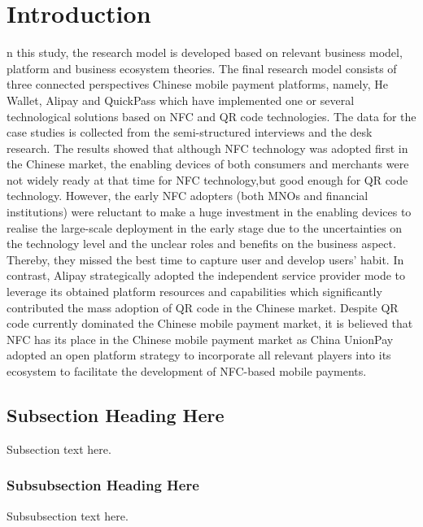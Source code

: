\documentclass[journal]{IEEEtran}
\begin{document}
\section{Introduction}
n this study, the research model is developed based on relevant business model, platform and
business ecosystem theories. The final research model consists of three connected perspectives
 Chinese mobile payment platforms, namely, He Wallet, Alipay and QuickPass which have
implemented one or several technological solutions based on NFC and QR code technologies. The
data for the case studies is collected from the semi-structured interviews and the desk research. The
results showed that although NFC technology was adopted first in the Chinese market, the enabling
devices of both consumers and merchants were not widely ready at that time for NFC technology,but good enough for QR code technology. However, the early NFC adopters (both MNOs and
financial institutions) were reluctant to make a huge investment in the enabling devices to realise
the large-scale deployment in the early stage due to the uncertainties on the technology level and
the unclear roles and benefits on the business aspect. Thereby, they missed the best time to capture
user and develop users' habit. In contrast, Alipay strategically adopted the independent service
provider mode to leverage its obtained platform resources and capabilities which significantly
contributed the mass adoption of QR code in the Chinese market. Despite QR code currently
dominated the Chinese mobile payment market, it is believed that NFC has its place in the Chinese
mobile payment market as China UnionPay adopted an open platform strategy to incorporate all
relevant players into its ecosystem to facilitate the development of NFC-based mobile payments.

\subsection{Subsection Heading Here}
Subsection text here.


\subsubsection{Subsubsection Heading Here}
Subsubsection text here.
\end{document}
